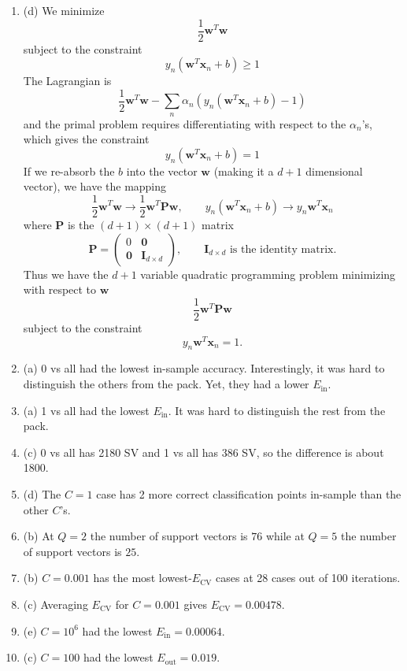 \documentclass[12pt]{article}
\begin{document}
\begin{enumerate}[leftmargin=*]
\item (d) We minimize
\[ \frac{1}{2} \mathbf w^T \mathbf w \]
subject to the constraint
\[ y_n \left( \mathbf w^T \mathbf x_n + b \right) \geq 1 \]
The Lagrangian is
\[ \frac{1}{2} \mathbf w^T \mathbf w - \sum_n \alpha_n \left(y_n \left( \mathbf w^T \mathbf x_n + b \right) - 1 \right) \]
and the primal problem requires differentiating with respect to the $\alpha_n$'s, which gives the constraint
\[ y_n (\mathbf w^T \mathbf x_n + b) = 1 \]
If we re-absorb the $b$ into the vector $\mathbf w$ (making it a $d+1$ dimensional vector), we have the mapping
\[ \frac{1}{2} \mathbf w^T \mathbf w \to \frac{1}{2} \mathbf w^T \mathbf P \mathbf w, \qquad y_n ( \mathbf w^T \mathbf x_n + b) \to y_n \mathbf w^T \mathbf x_n \]
where $\mathbf P$ is the $(d + 1) \times (d + 1)$ matrix
\[ \mathbf P = \begin{pmatrix} 0 & \mathbf 0 \\ \mathbf 0 & \mathbf I_{d \times d} \end{pmatrix}, \qquad \text{$\mathbf I_{d \times d}$ is the identity matrix}. \]
Thus we have the $d + 1$ variable quadratic programming problem minimizing with respect to $\mathbf w$
\[ \frac{1}{2} \mathbf w^T \mathbf P \mathbf w \]
subject to the constraint
\[ y_n \mathbf w^T \mathbf x_n = 1. \]
\item (a) 0 vs all had the lowest in-sample accuracy. Interestingly, it was hard to distinguish the others from the pack. Yet, they had a lower $E_{\text{in}}$.
\item (a) 1 vs all had the lowest $E_{\text{in}}$. It was hard to distinguish the rest from the pack.
\item (c) 0 vs all has 2180 SV and 1 vs all has 386 SV, so the difference is about 1800.
\item (d) The $C = 1$ case has 2 more correct classification points in-sample than the other $C$'s.
\item (b) At $Q = 2$ the number of support vectors is $76$ while at $Q = 5$ the number of support vectors is $25$.
\item (b) $C = 0.001$ has the most lowest-$E_{\text{CV}}$ cases at 28 cases out of 100 iterations.
\item (c) Averaging $E_{\text{CV}}$ for $C = 0.001$ gives $E_{\text{CV}} = 0.00478$.
\item (e) $C = 10^6$ had the lowest $E_{\text{in}} = 0.00064$.
\item (c) $C = 100$ had the lowest $E_{\text{out}} = 0.019$.
\end{enumerate}
\end{document}
